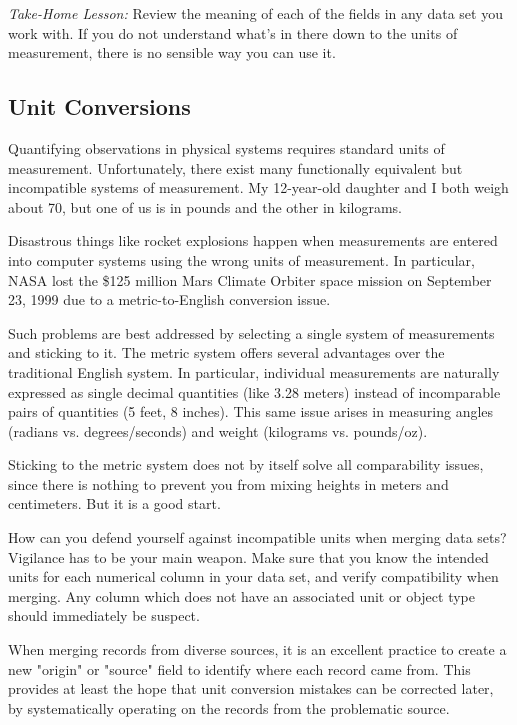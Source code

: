 \documentclass[10pt]{article}
\begin{document}
\emph{Take-Home Lesson:} Review the meaning of each of the fields in any data set you work with. If you do not understand what's in there down to the units of measurement, there is no sensible way you can use it.

\subsection{Unit Conversions}
Quantifying observations in physical systems requires standard units of measurement. Unfortunately, there exist many functionally equivalent but incompatible systems of measurement. My 12-year-old daughter and I both weigh about 70, but one of us is in pounds and the other in kilograms.


Disastrous things like rocket explosions happen when measurements are entered into computer systems using the wrong units of measurement. In particular, NASA lost the \$125 million Mars Climate Orbiter space mission on September 23, 1999 due to a metric-to-English conversion issue.

Such problems are best addressed by selecting a single system of measurements and sticking to it. The metric system offers several advantages over the traditional English system. In particular, individual measurements are naturally expressed as single decimal quantities (like 3.28 meters) instead of incomparable pairs of quantities (5 feet, 8 inches). This same issue arises in measuring angles (radians vs. degrees/seconds) and weight (kilograms vs. pounds/oz).

Sticking to the metric system does not by itself solve all comparability issues, since there is nothing to prevent you from mixing heights in meters and centimeters. But it is a good start.

How can you defend yourself against incompatible units when merging data sets? Vigilance has to be your main weapon. Make sure that you know the intended units for each numerical column in your data set, and verify compatibility when merging. Any column which does not have an associated unit or object type should immediately be suspect.

When merging records from diverse sources, it is an excellent practice to create a new "origin" or "source" field to identify where each record came from. This provides at least the hope that unit conversion mistakes can be corrected later, by systematically operating on the records from the problematic source.
\end{document}
